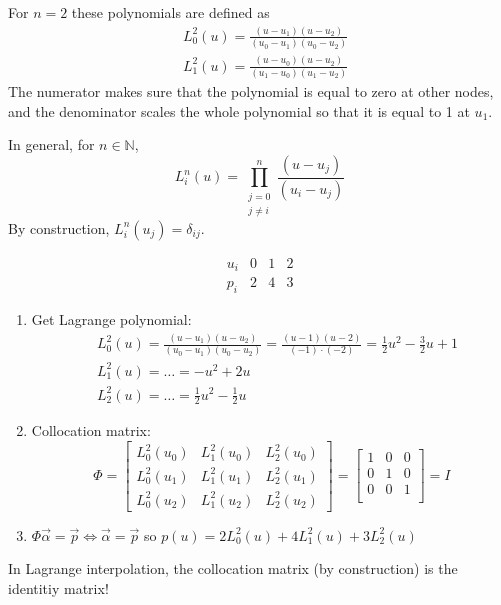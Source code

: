 \begin{example}
    For $n=2$ these polynomials are defined as
    \begin{align*}
        &
        L_0^2(u) = \frac{(u - u_1)(u - u_2)}{(u_0 - u_1)(u_0 - u_2)}
        \\&
        L_1^2(u) = \frac{(u - u_0)(u - u_2)}{(u_1 - u_0)(u_1 - u_2)}
    \end{align*}
    The numerator makes sure that the polynomial is equal to zero at
    other nodes, and the denominator scales the whole polynomial
    so that it is equal to 1 at $u_1$.
\end{example}

In general, for $n \in \mathbb{N}$,
\[
    L_i^n(u) = \prod_{\substack{j=0 \\ j \ne i}}^n 
    \frac{(u - u_j)}{(u_i - u_j)}
\]
By construction, $L_i^n(u_j) = \delta_{ij}$.
\begin{example}
    \[ \begin{array}{c|c|c|c}
        u_i & 0 & 1 & 2\\
        \hline
        p_i & 2 & 4 & 3
    \end{array} \]
    \begin{enumerate}[font={\bfseries}, label={Step \arabic*.}]
        \item {
            Get Lagrange polynomial:
            \begin{align*}
                &
                L_0^2(u) =  \frac{(u - u_1)(u - u_2)}{(u_0 - u_1)(u_0 - u_2)} =
                \frac{(u - 1)(u - 2)}{(-1) \cdot (-2)} = \frac{1}{2} u^2 - \frac{3}{2}u + 1
                \\&
                L_1^2(u) = \dots = -u^2 + 2u
                \\&
                L_2^2(u) = \dots = \frac{1}{2} u^2 - \frac{1}{2} u
            \end{align*}
        }
        \item {
            Collocation matrix:
            \[
                \Phi = \begin{bmatrix}
                    L_0^2(u_0) & L_1^2(u_0) & L_2^2(u_0)\\
                    L_0^2(u_1) & L_1^2(u_1) & L_2^2(u_1)\\
                    L_0^2(u_2) & L_1^2(u_2) & L_2^2(u_2)
                \end{bmatrix} = \begin{bmatrix}
                    1 & 0 & 0\\
                    0 & 1 & 0\\
                    0 & 0 & 1\\
                \end{bmatrix} = I
            \]
        }
        \item {
            $\Phi \vec{\alpha} = \vec{p} \iff \vec{\alpha} = \vec{p}$
            so $p(u) = 2 L_0^2(u) + 4L_1^2(u) + 3L_2^2(u)$
        }
    \end{enumerate}
\end{example}
\begin{consequence}
    In Lagrange interpolation, the collocation matrix (by construction) is the identitiy matrix!
\end{consequence}

